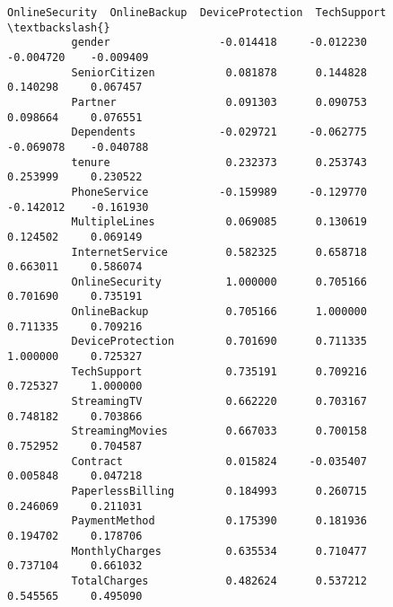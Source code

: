 \documentclass[11pt]{article}
\begin{document}
\begin{Verbatim}[commandchars=\\\{\}]
                            OnlineSecurity  OnlineBackup  DeviceProtection  TechSupport  \textbackslash{}
          gender                 -0.014418     -0.012230         -0.004720    -0.009409   
          SeniorCitizen           0.081878      0.144828          0.140298     0.067457   
          Partner                 0.091303      0.090753          0.098664     0.076551   
          Dependents             -0.029721     -0.062775         -0.069078    -0.040788   
          tenure                  0.232373      0.253743          0.253999     0.230522   
          PhoneService           -0.159989     -0.129770         -0.142012    -0.161930   
          MultipleLines           0.069085      0.130619          0.124502     0.069149   
          InternetService         0.582325      0.658718          0.663011     0.586074   
          OnlineSecurity          1.000000      0.705166          0.701690     0.735191   
          OnlineBackup            0.705166      1.000000          0.711335     0.709216   
          DeviceProtection        0.701690      0.711335          1.000000     0.725327   
          TechSupport             0.735191      0.709216          0.725327     1.000000   
          StreamingTV             0.662220      0.703167          0.748182     0.703866   
          StreamingMovies         0.667033      0.700158          0.752952     0.704587   
          Contract                0.015824     -0.035407          0.005848     0.047218   
          PaperlessBilling        0.184993      0.260715          0.246069     0.211031   
          PaymentMethod           0.175390      0.181936          0.194702     0.178706   
          MonthlyCharges          0.635534      0.710477          0.737104     0.661032   
          TotalCharges            0.482624      0.537212          0.545565     0.495090   
          

\end{Verbatim}
\end{document}
